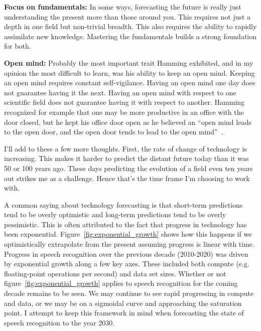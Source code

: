 {\bf Focus on fundamentals:} In some ways, forecasting the future is really
just understanding the present more than those around you. This requires not
just a depth in one field but non-trivial breadth. This also requires the
ability to rapidly assimilate new knowledge. Mastering the fundamentals builds
a strong foundation for both.

{\bf Open mind:} Probably the most important trait Hamming exhibited, and in my
opinion the most difficult to learn, was his ability to keep an open mind.
Keeping an open mind requires constant self-vigilance. Having an open mind one
day does not guarantee having it the next. Having an open mind with respect to
one scientific field does not guarantee having it with respect to another.
Hamming recognized for example that one may be more productive in an office
with the door closed, but he kept his office door open as he believed an ``open
mind leads to the open door, and the open door tends to lead to the open
mind''~\citep[chp. 30]{hamming1997art}.

I'll add to these a few more thoughts. First, the rate of change of
technology is increasing. This makes it harder to predict the distant
future today than it was 50 or 100 years ago. These days predicting the
evolution of a field even ten years out strikes me as a challenge. Hence that's
the time frame I'm choosing to work with.

A common saying about technology forecasting is that short-term predictions
tend to be overly optimistic and long-term predictions tend to be overly
pessimistic. This is often attributed to the fact that progress in technology
has been exponential. Figure~\ref{fig:exponential_growth} shows how this
happens if we optimistically extrapolate from the present assuming progress is
linear with time. Progress in speech recognition over the previous decade
(2010-2020) was driven by exponential growth along a few key axes. These
included both compute (e.g. floating-point operations per second) and data set
sizes. Whether or not figure~\ref{fig:exponential_growth} applies to speech
recognition for the coming decade remains to be seen. We may continue to see
rapid progressing in compute and data, or we may be on a sigmoidal curve and
approaching the saturation point. I attempt to keep this framework in mind
when forecasting the state of speech recognition to the year 2030.

